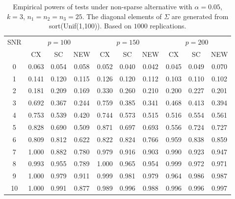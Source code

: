 \documentclass[review]{elsarticle}
\theoremstyle{plain}
\theoremstyle{definition}
\theoremstyle{remark}
\begin{document}
\begin{table}[!hbp]
    \caption{Empirical powers of tests under non-sparse alternative with $\alpha=0.05$, $k=3$, $n_1=n_2=n_3=25$. The diagonal elements of $\Sigma$ are generated from sort(Unif(1,100)). Based on $1000$ replications.}
    \centering
\begin{tabular}{*{10}{c}}
\toprule
\multirow{2}{*}{SNR} &\multicolumn{3}{c}{$p=100$}&\multicolumn{3}{c}{$p=150$}&\multicolumn{3}{c}{$p=200$} \\
    \cmidrule(r){2-4}\cmidrule(r){5-7}\cmidrule(r){8-10}
        & CX & SC & NEW & CX &SC &NEW &CX & SC & NEW\\
\midrule
0 & 0.063 & 0.054 & 0.058 & 0.052 & 0.040 & 0.042 & 0.045 & 0.049 & 0.070 \\ 
1 & 0.141 & 0.120 & 0.115 & 0.126 & 0.120 & 0.112 & 0.103 & 0.110 & 0.102 \\ 
2 & 0.181 & 0.209 & 0.169 & 0.330 & 0.260 & 0.210 & 0.200 & 0.227 & 0.201 \\ 
3 & 0.692 & 0.367 & 0.244 & 0.759 & 0.385 & 0.341 & 0.468 & 0.413 & 0.394 \\ 
4 & 0.753 & 0.539 & 0.420 & 0.744 & 0.573 & 0.515 & 0.516 & 0.554 & 0.561 \\ 
5 & 0.828 & 0.690 & 0.509 & 0.871 & 0.697 & 0.693 & 0.556 & 0.724 & 0.727 \\ 
6 & 0.809 & 0.812 & 0.622 & 0.822 & 0.824 & 0.766 & 0.959 & 0.838 & 0.859 \\ 
7 & 1.000 & 0.882 & 0.780 & 0.979 & 0.916 & 0.903 & 0.990 & 0.923 & 0.947 \\ 
8 & 0.993 & 0.955 & 0.789 & 1.000 & 0.965 & 0.954 & 0.999 & 0.972 & 0.971 \\ 
9 & 1.000 & 0.979 & 0.911 & 0.999 & 0.981 & 0.979 & 0.964 & 0.986 & 0.987 \\ 
10 & 1.000 & 0.991 & 0.877 & 0.989 & 0.996 & 0.988 & 0.996 & 0.996 & 0.997 \\ 
\bottomrule
\end{tabular}
\end{table}
\end{document}
